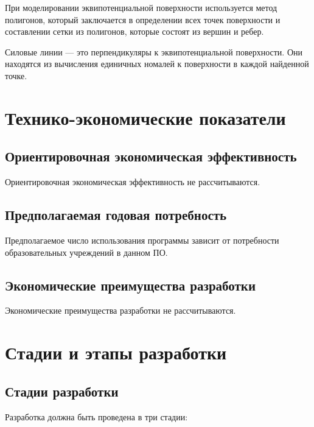 \documentclass[14pt,a4paper,final]{extreport}
\begin{document}
При моделировании эквипотенциальной поверхности используется метод полигонов, который заключается в определении всех точек поверхности и составлении сетки из полигонов, которые состоят из вершин и ребер.

Силовые линии --- это перпендикуляры к эквипотенциальной поверхности. Они находятся из вычисления единичных номалей к поверхности в каждой найденной точке.

\pagebreak %

\chapter{Технико-экономические показатели}


\section{Ориентировочная экономическая эффективность}
Ориентировочная экономическая эффективность не рассчитываются.

\section{Предполагаемая годовая потребность}
Предполагаемое число использования программы зависит от потребности образовательных учреждений в данном ПО.

\section{Экономические преимущества разработки}
Экономические преимущества разработки не рассчитываются.

	\pagebreak %

\chapter{Стадии и этапы разработки}

\fancyhead[C]{\bfseries\thepage\\\docstamp}  %


\section{Стадии разработки}
Разработка должна быть проведена в три стадии:
\end{document}
